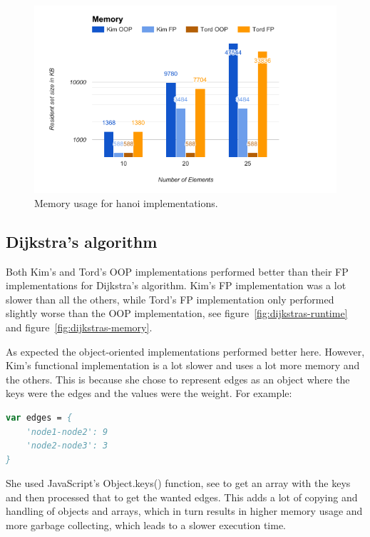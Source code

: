 \documentclass {article}
\begin{document}
\begin{figure}[H]
\includegraphics[width=\textwidth]{hanoi-memory}

\caption{Memory usage for hanoi implementations.}
\label{fig:hanoi-memory}
\end{figure}
\subsection{Dijkstra's algorithm}
Both Kim's and Tord's OOP implementations performed better than their FP implementations for Dijkstra's algorithm. Kim's FP implementation was a lot slower than all the others, while Tord's FP implementation only performed slightly worse than the OOP implementation, see figure~\ref{fig:dijkstras-runtime} and figure~\ref{fig:dijkstras-memory}. 

As expected the object-oriented implementations performed better here. However, Kim's functional implementation is a lot slower and uses a lot more memory and the others. This is because she chose to represent edges as an object where the keys were the edges and the values were the weight. For example:

\begin{lstlisting}[language=Pascal]
var edges = {
	'node1-node2': 9
	'node2-node3': 3
}
\end{lstlisting}

She used JavaScript's Object.keys() function, see \cite{jsref} to get an array with the keys and then processed that to get the wanted edges. This adds a lot of copying and handling of objects and arrays, which in turn results in higher memory usage and more garbage collecting, which leads to a slower execution time.
\end{document}
